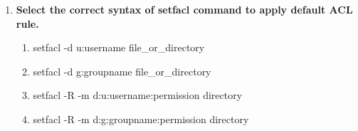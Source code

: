 \begin{flushleft}
\begin{enumerate}
		\item \textbf{Select the correct syntax of setfacl command to apply default ACL rule.}
		\begin{enumerate}[label=(\alph*)]
			\item setfacl -d u:username  file\_or\_directory  
			\item setfacl -d g:groupname  file\_or\_directory  
			\item setfacl -R -m d:u:username:permission  directory %
			\item setfacl -R -m d:g:groupname:permission  directory    %
		\end{enumerate}
		\bigskip
		\bigskip
	\end{enumerate}
	
	
\end{flushleft}

\newpage

